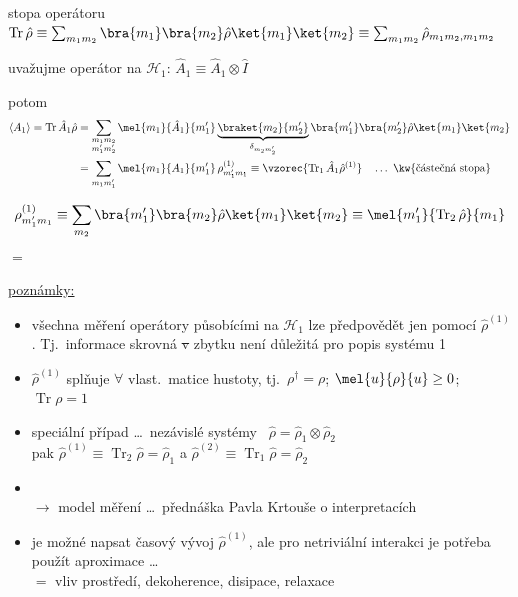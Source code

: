 stopa operátoru \quad $\operatorname{Tr}\hat\rho \equiv \sum_{m_1m_2}\bra{m_1}\bra{m_2}\hat\rho\ket{m_1}\ket{m_2} \equiv \sum_{m_1m_2}\hat\rho_{m_1m_2,m_1m_2}$

uvažujme operátor na $\mathcal{H}_1$: \quad $\hat A_1 \equiv \hat A_1\otimes\hat I$

potom
\begin{align*}
  \langle A_1\rangle = \operatorname{Tr}\hat A_1\hat\rho
  &= \sum_{\substack{m_1m_2\\ m_1'm_2'}}\mel{m_1}{\hat A_1}{m_1'}\underbrace{\braket{m_2}{m_2'}}_{\delta_{m_2m_2'}}\bra{m_1'}\bra{m_2'}\hat\rho\ket{m_1}\ket{m_2} \\
  &= \sum_{m_1m_1'}\mel{m_1}{A_1}{m_1'}\,\rho^{(1)}_{m_1'm_1} \equiv \vzorec{\operatorname{Tr}_1\hat A_1\hat\rho^{(1)}} \quad\dots\ \text{\kw{částečná stopa}}
\end{align*}

\begin{definice}
\[
  \rho^{(1)}_{m_1'm_1} \equiv \sum_{m_2}\bra{m_1'}\bra{m_2}\hat\rho\ket{m_1}\ket{m_2} \equiv \mel{m_1'}{\operatorname{Tr}_2\hat\rho}{m_1}
\]
$=$ 
\end{definice}

\underline{poznámky:}
\begin{itemize}
  \item všechna měření operátory působícími na $\mathcal{H}_1$ lze předpovědět jen pomocí $\hat\rho^{(1)}$. Tj.\ informace skrovná \sout{v} zbytku není důležitá pro popis systému 1 \\
  \item $\hat\rho^{(1)}$ splňuje $\forall$ vlast.\ matice hustoty, tj.\ $\rho^\dagger = \rho$; $\mel{u}{\rho}{u}\geq 0$; $\operatorname{Tr}\rho = 1$
  \item speciální případ \dots\ nezávislé systémy \ $\hat\rho = \hat\rho_1\otimes\hat\rho_2$ \\
        pak \quad $\hat\rho^{(1)} \equiv \operatorname{Tr}_2\hat\rho = \hat\rho_1$ \quad a \quad $\hat\rho^{(2)} \equiv \operatorname{Tr}_1\hat\rho = \hat\rho_2$
  \item {} \\
        $\to$ model měření \dots\ přednáška Pavla Krtouše o interpretacích
  \item je možné napsat časový vývoj $\hat\rho^{(1)}$, ale pro netriviální interakci je potřeba použít aproximace \dots\  \\
        $=$ vliv prostředí, dekoherence, disipace, relaxace
\end{itemize}

